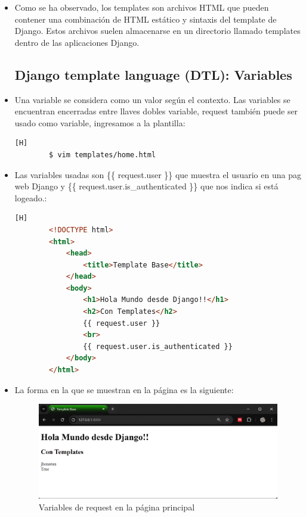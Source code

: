 \documentclass{article}
\begin{document}
\begin{itemize}
            \item Como se ha observado, los templates son archivos HTML que pueden contener una combinación de HTML estático y sintaxis del template de Django. Estos archivos suelen almacenarse en un directorio llamado templates dentro de las aplicaciones Django.

        \subsection{Django template language (DTL): Variables}
            \item Una variable se considera como un valor según el contexto. Las variables se encuentran encerradas entre llaves dobles {{variable}}, request también puede ser usado como variable, ingresamos a la plantilla:

            \begin{lstlisting}[language=bash,caption={Ingresando a home.html}][H]
        $ vim templates/home.html
        \end{lstlisting}
    \clearpage

            \item Las variables usadas son \{\{ request.user \}\} que muestra el usuario en una pag web Django y \{\{ request.user.is\_authenticated \}\} que nos indica si está logeado.:
            
        \begin{lstlisting}[language=HTML,caption={Agregación de variables de Django}][H]
        <!DOCTYPE html>
        <html>
            <head>
                <title>Template Base</title>
            </head>
            <body>
                <h1>Hola Mundo desde Django!!</h1>
                <h2>Con Templates</h2>
                {{ request.user }}
                <br>
                {{ request.user.is_authenticated }}
            </body>
        </html>
        \end{lstlisting}
            \item La forma en la que se muestran en la página es la siguiente:
        \begin{figure}[H]
            \centering
            \includegraphics[width=1\linewidth]{img/Variables.png}
            \caption{Variables de request en la página principal}
            \label{fig:enter-label}
        \end{figure}
            

\end{itemize}
\end{document}

